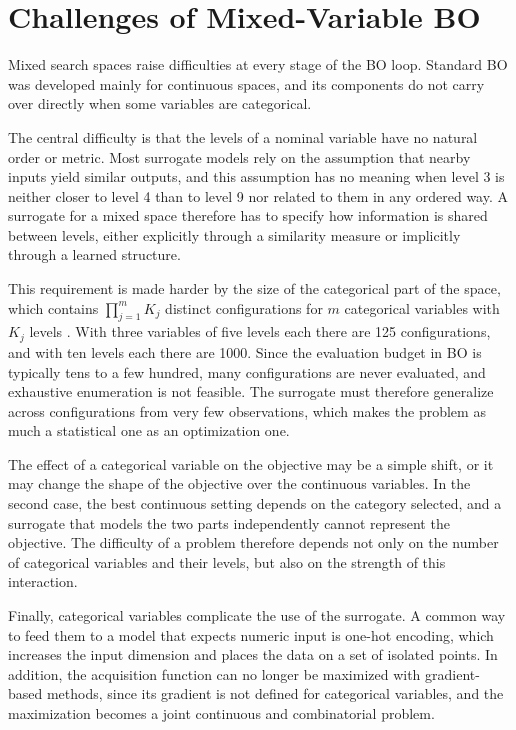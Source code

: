 \section{Challenges of Mixed-Variable BO}

Mixed search spaces raise difficulties at every stage of the BO loop. Standard BO was developed mainly for continuous spaces, and its components do not carry over directly when some variables are categorical.

The central difficulty is that the levels of a nominal variable have no natural order or metric. Most surrogate models rely on the assumption that nearby inputs yield similar outputs, and this assumption has no meaning when level 3 is neither closer to level 4 than to level 9 nor related to them in any ordered way. A surrogate for a mixed space therefore has to specify how information is shared between levels, either explicitly through a similarity measure or implicitly through a learned structure.

This requirement is made harder by the size of the categorical part of the space, which contains $\prod_{j=1}^{m} K_j$ distinct configurations for $m$ categorical variables with $K_j$ levels \citep{NEURIPS2019_2cb6b103}. With three variables of five levels each there are 125 configurations, and with ten levels each there are 1000. Since the evaluation budget in BO is typically tens to a few hundred, many configurations are never evaluated, and exhaustive enumeration is not feasible. The surrogate must therefore generalize across configurations from very few observations, which makes the problem as much a statistical one as an optimization one.

The effect of a categorical variable on the objective may be a simple shift, or it may change the shape of the objective over the continuous variables. In the second case, the best continuous setting depends on the category selected, and a surrogate that models the two parts independently cannot represent the objective. The difficulty of a problem therefore depends not only on the number of categorical variables and their levels, but also on the strength of this interaction.

Finally, categorical variables complicate the use of the surrogate. A common way to feed them to a model that expects numeric input is one-hot encoding, which increases the input dimension and places the data on a set of isolated points. In addition, the acquisition function can no longer be maximized with gradient-based methods, since its gradient is not defined for categorical variables, and the maximization becomes a joint continuous and combinatorial problem.

